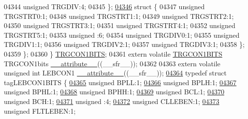 \begin{DoxyCode}
04344       \textcolor{keywordtype}{unsigned} TRGDIV:4;
04345     \};
\hypertarget{a00015_source_l04346}{}\hyperlink{a00015}{04346}     \textcolor{keyword}{struct }\{
04347       \textcolor{keywordtype}{unsigned} TRGSTRT0:1;
04348       \textcolor{keywordtype}{unsigned} TRGSTRT1:1;
04349       \textcolor{keywordtype}{unsigned} TRGSTRT2:1;
04350       \textcolor{keywordtype}{unsigned} TRGSTRT3:1;
04351       \textcolor{keywordtype}{unsigned} TRGSTRT4:1;
04352       \textcolor{keywordtype}{unsigned} TRGSTRT5:1;
04353       \textcolor{keywordtype}{unsigned} :6;
04354       \textcolor{keywordtype}{unsigned} TRGDIV0:1;
04355       \textcolor{keywordtype}{unsigned} TRGDIV1:1;
04356       \textcolor{keywordtype}{unsigned} TRGDIV2:1;
04357       \textcolor{keywordtype}{unsigned} TRGDIV3:1;
04358     \};
04359   \};
04360 \} \hyperlink{a00014_d4/dfd/a00810}{TRGCON1BITS};
04361 \textcolor{keyword}{extern} \textcolor{keyword}{volatile} \hyperlink{a00014_d4/dfd/a00810}{TRGCON1BITS} TRGCON1bits \hyperlink{a00015_a493c46f03454991ccc5aa7a6e1dfb2a7}{\_\_attribute\_\_}((\_\_sfr\_\_));
04362 
04363 \textcolor{keyword}{extern} \textcolor{keyword}{volatile} \textcolor{keywordtype}{unsigned} \textcolor{keywordtype}{int}  LEBCON1 \hyperlink{a00015_a493c46f03454991ccc5aa7a6e1dfb2a7}{\_\_attribute\_\_}((\_\_sfr\_\_));
\hypertarget{a00015_source_l04364}{}\hyperlink{a00014}{04364} \textcolor{keyword}{typedef} \textcolor{keyword}{struct }tagLEBCON1BITS \{
\hypertarget{a00015_source_l04365}{}\hyperlink{a00014_a734b807d032fa494468c04783b84279d}{04365}   \textcolor{keywordtype}{unsigned} BPLL:1;
\hypertarget{a00015_source_l04366}{}\hyperlink{a00014_ab92bd28ed3161199870cae9dca9d8264}{04366}   \textcolor{keywordtype}{unsigned} BPLH:1;
\hypertarget{a00015_source_l04367}{}\hyperlink{a00014_ab1b78e048d280a836358a465b1670e7a}{04367}   \textcolor{keywordtype}{unsigned} BPHL:1;
\hypertarget{a00015_source_l04368}{}\hyperlink{a00014_a8fd804263987e931f779f124751138e1}{04368}   \textcolor{keywordtype}{unsigned} BPHH:1;
\hypertarget{a00015_source_l04369}{}\hyperlink{a00014_acead45594aa9d4a55a37f37fdcc3f0a0}{04369}   \textcolor{keywordtype}{unsigned} BCL:1;
\hypertarget{a00015_source_l04370}{}\hyperlink{a00014_a485d688549b456635ec3ac860ad7cdaf}{04370}   \textcolor{keywordtype}{unsigned} BCH:1;
\hypertarget{a00015_source_l04371}{}\hyperlink{a00014_adf71f3d8410c1f1dbbc96680a92c49af}{04371}   \textcolor{keywordtype}{unsigned} :4;
\hypertarget{a00015_source_l04372}{}\hyperlink{a00014_a4ec62ac7ec38a6cf1ca2276db69912a9}{04372}   \textcolor{keywordtype}{unsigned} CLLEBEN:1;
\hypertarget{a00015_source_l04373}{}\hyperlink{a00014_aa96ca2430a7a6200927f390d1aa0b21a}{04373}   \textcolor{keywordtype}{unsigned} FLTLEBEN:1;

\end{DoxyCode}
